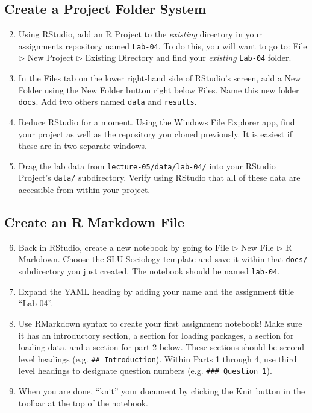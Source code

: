 \documentclass{tufte-handout}
\begin{document}
\subsection{Create a Project Folder System}
\begin{enumerate}[label=\alph*.]
\setcounter{enumi}{1}
\item Using RStudio, add an R Project to the \textit{existing} directory in your assignments repository named \texttt{Lab-04}. To do this, you will want to go to: \textsf{File $\triangleright$} {\color{red}\textsf{New Project}} \textsf{$\triangleright$ Existing Directory} and find your \textit{existing} \texttt{Lab-04} folder.
\item In the \textsf{Files} tab on the lower right-hand side of RStudio's screen, add a New Folder using the \textsf{New Folder} button right below \textsf{Files}. Name this new folder \texttt{docs}. Add two others named \texttt{data} and \texttt{results}.
\item Reduce RStudio for a moment. Using the Windows File Explorer app, find your project as well as the repository you cloned previously. It is easiest if these are in two separate windows.
\item Drag the lab data from \texttt{lecture-05/data/lab-04/} into your RStudio Project's \texttt{data/} subdirectory. Verify using RStudio that all of these data are accessible from within your project.
\end{enumerate}

\vspace{3mm}
\subsection{Create an R Markdown File}
\begin{enumerate}[label=\alph*.]
\setcounter{enumi}{5}
\item Back in RStudio, create a new notebook by going to \textsf{File $\triangleright$ New File $\triangleright$} {\color{red}\textsf{R Markdown}}. Choose the SLU Sociology template and save it within that \texttt{docs/} subdirectory you just created. The notebook should be named \texttt{lab-04}.
\item Expand the YAML heading by adding your name and the assignment title ``Lab 04''.
\item Use RMarkdown syntax to create your first assignment notebook! Make sure it has an introductory section, a section for loading packages, a section for loading data, and a section for part 2 below. These sections should be second-level headings (e.g. \texttt{\#\# Introduction}). Within Parts 1 through 4, use third level headings to designate question numbers (e.g. \texttt{\#\#\# Question 1}).
\item When you are done, ``knit'' your document by clicking the \textsf{Knit} button in the toolbar at the top of the notebook.
\end{enumerate}
\end{document}
